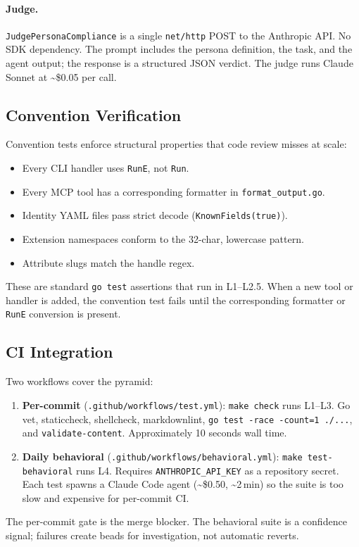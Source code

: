 \documentclass[a4paper,10pt]{article}
\newcommand{\cmd}[1]{\texttt{#1}}
\newcommand{\fpath}[1]{\texttt{#1}}
\begin{document}
\paragraph{Judge.}
\texttt{JudgePersonaCompliance} is a single \texttt{net/http} POST
to the Anthropic API.  No SDK dependency.  The prompt includes the
persona definition, the task, and the agent output; the response is
a structured JSON verdict.  The judge runs Claude Sonnet at
\textasciitilde\$0.05 per call.

\subsection{Convention Verification}

Convention tests enforce structural properties that code review
misses at scale:

\begin{itemize}
  \item Every CLI handler uses \texttt{RunE}, not \texttt{Run}.
  \item Every MCP tool has a corresponding formatter in
    \texttt{format\_output.go}.
  \item Identity YAML files pass strict decode
    (\texttt{KnownFields(true)}).
  \item Extension namespaces conform to the 32-char, lowercase
    pattern.
  \item Attribute slugs match the handle regex.
\end{itemize}

These are standard \texttt{go test} assertions that run in L1--L2.5.
When a new tool or handler is added, the convention test fails until
the corresponding formatter or \texttt{RunE} conversion is present.

\subsection{CI Integration}

Two workflows cover the pyramid:

\begin{enumerate}
  \item \textbf{Per-commit} (\fpath{.github/workflows/test.yml}):
    \cmd{make check} runs L1--L3.  Go vet, staticcheck, shellcheck,
    markdownlint, \texttt{go test -race -count=1 ./...}, and
    \cmd{validate-content}.
    Approximately 10 seconds wall time.
  \item \textbf{Daily behavioral}
    (\fpath{.github/workflows/behavioral.yml}):
    \cmd{make test-behavioral} runs L4.  Requires
    \texttt{ANTHROPIC\_API\_KEY} as a repository secret.  Each test
    spawns a Claude Code agent (\textasciitilde\$0.50,
    \textasciitilde 2\,min) so the suite is too slow and expensive
    for per-commit CI.
\end{enumerate}

The per-commit gate is the merge blocker.  The behavioral suite is
a confidence signal; failures create beads for investigation, not
automatic reverts.
\end{document}
